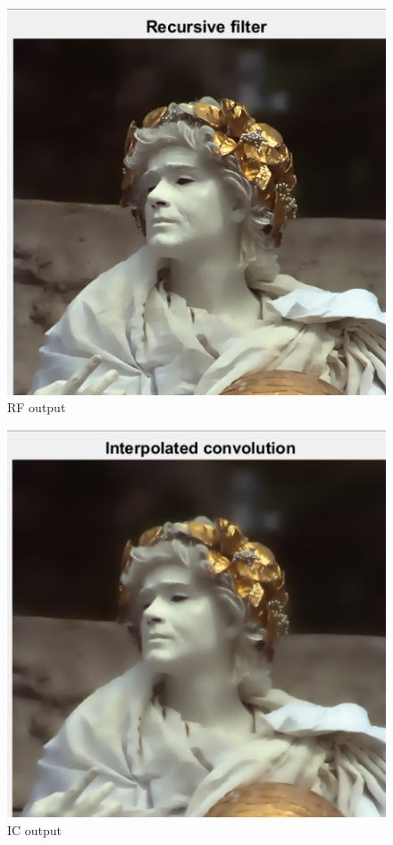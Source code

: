 \documentclass[conference]{IEEEtran}
\begin{document}
 \begin{figure}
 	\includegraphics[width = \linewidth]{RF_output.png}
 	\caption{RF output}
 \end{figure}
 
  \begin{figure}
 	\includegraphics[width = \linewidth]{IC_output.png}
 	\caption{IC output}
 \end{figure}
 
\end{document}
